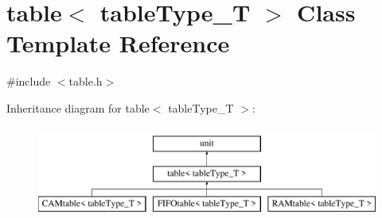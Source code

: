 \hypertarget{classtable}{
\section{table$<$ tableType\_\-T $>$ Class Template Reference}
\label{classtable}
}


{\ttfamily \#include $<$table.h$>$}

Inheritance diagram for table$<$ tableType\_\-T $>$:\begin{figure}[H]
\begin{center}
\leavevmode
\includegraphics[height=3.000000cm]{classtable}
\end{center}
\end{figure}
